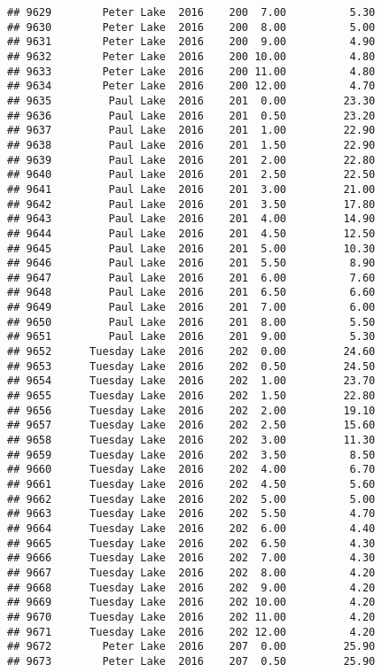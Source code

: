 \documentclass[
]{article}
\begin{document}
\begin{verbatim}
## 9629        Peter Lake  2016    200  7.00          5.30
## 9630        Peter Lake  2016    200  8.00          5.00
## 9631        Peter Lake  2016    200  9.00          4.90
## 9632        Peter Lake  2016    200 10.00          4.80
## 9633        Peter Lake  2016    200 11.00          4.80
## 9634        Peter Lake  2016    200 12.00          4.70
## 9635         Paul Lake  2016    201  0.00         23.30
## 9636         Paul Lake  2016    201  0.50         23.20
## 9637         Paul Lake  2016    201  1.00         22.90
## 9638         Paul Lake  2016    201  1.50         22.90
## 9639         Paul Lake  2016    201  2.00         22.80
## 9640         Paul Lake  2016    201  2.50         22.50
## 9641         Paul Lake  2016    201  3.00         21.00
## 9642         Paul Lake  2016    201  3.50         17.80
## 9643         Paul Lake  2016    201  4.00         14.90
## 9644         Paul Lake  2016    201  4.50         12.50
## 9645         Paul Lake  2016    201  5.00         10.30
## 9646         Paul Lake  2016    201  5.50          8.90
## 9647         Paul Lake  2016    201  6.00          7.60
## 9648         Paul Lake  2016    201  6.50          6.60
## 9649         Paul Lake  2016    201  7.00          6.00
## 9650         Paul Lake  2016    201  8.00          5.50
## 9651         Paul Lake  2016    201  9.00          5.30
## 9652      Tuesday Lake  2016    202  0.00         24.60
## 9653      Tuesday Lake  2016    202  0.50         24.50
## 9654      Tuesday Lake  2016    202  1.00         23.70
## 9655      Tuesday Lake  2016    202  1.50         22.80
## 9656      Tuesday Lake  2016    202  2.00         19.10
## 9657      Tuesday Lake  2016    202  2.50         15.60
## 9658      Tuesday Lake  2016    202  3.00         11.30
## 9659      Tuesday Lake  2016    202  3.50          8.50
## 9660      Tuesday Lake  2016    202  4.00          6.70
## 9661      Tuesday Lake  2016    202  4.50          5.60
## 9662      Tuesday Lake  2016    202  5.00          5.00
## 9663      Tuesday Lake  2016    202  5.50          4.70
## 9664      Tuesday Lake  2016    202  6.00          4.40
## 9665      Tuesday Lake  2016    202  6.50          4.30
## 9666      Tuesday Lake  2016    202  7.00          4.30
## 9667      Tuesday Lake  2016    202  8.00          4.20
## 9668      Tuesday Lake  2016    202  9.00          4.20
## 9669      Tuesday Lake  2016    202 10.00          4.20
## 9670      Tuesday Lake  2016    202 11.00          4.20
## 9671      Tuesday Lake  2016    202 12.00          4.20
## 9672        Peter Lake  2016    207  0.00         25.90
## 9673        Peter Lake  2016    207  0.50         25.90

\end{verbatim}
\end{document}
